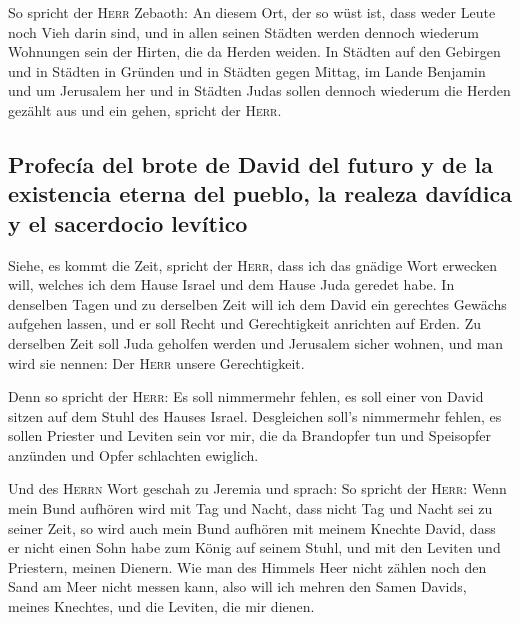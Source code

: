  So spricht der \textsc{Herr} Zebaoth: An diesem Ort, der
so wüst ist, dass weder Leute noch Vieh darin sind, und in allen seinen
Städten werden dennoch wiederum Wohnungen sein der Hirten, die da Herden
weiden.  In Städten auf den Gebirgen und in Städten in
Gründen und in Städten gegen Mittag, im Lande Benjamin und um Jerusalem
her und in Städten Judas sollen dennoch wiederum die Herden gezählt aus
und ein gehen, spricht der \textsc{Herr}.

\hypertarget{profecuxeda-del-brote-de-david-del-futuro-y-de-la-existencia-eterna-del-pueblo-la-realeza-davuxeddica-y-el-sacerdocio-levuxedtico}{%
\subsection{Profecía del brote de David del futuro y de la existencia
eterna del pueblo, la realeza davídica y el sacerdocio
levítico}\label{profecuxeda-del-brote-de-david-del-futuro-y-de-la-existencia-eterna-del-pueblo-la-realeza-davuxeddica-y-el-sacerdocio-levuxedtico}}

 Siehe, es kommt die Zeit, spricht der \textsc{Herr},
dass ich das gnädige Wort erwecken will, welches ich dem Hause Israel
und dem Hause Juda geredet habe.  In denselben Tagen und
zu derselben Zeit will ich dem David ein gerechtes Gewächs aufgehen
lassen, und er soll Recht und Gerechtigkeit anrichten auf Erden.
 Zu derselben Zeit soll Juda geholfen werden und
Jerusalem sicher wohnen, und man wird sie nennen: Der \textsc{Herr}
unsere Gerechtigkeit.

 Denn so spricht der \textsc{Herr}: Es soll nimmermehr
fehlen, es soll einer von David sitzen auf dem Stuhl des Hauses Israel.
 Desgleichen soll's nimmermehr fehlen, es sollen Priester
und Leviten sein vor mir, die da Brandopfer tun und Speisopfer anzünden
und Opfer schlachten ewiglich.

 Und des \textsc{Herrn} Wort geschah zu Jeremia und
sprach:  So spricht der \textsc{Herr}: Wenn mein Bund
aufhören wird mit Tag und Nacht, dass nicht Tag und Nacht sei zu seiner
Zeit,  so wird auch mein Bund aufhören mit meinem Knechte
David, dass er nicht einen Sohn habe zum König auf seinem Stuhl, und mit
den Leviten und Priestern, meinen Dienern.  Wie man des
Himmels Heer nicht zählen noch den Sand am Meer nicht messen kann, also
will ich mehren den Samen Davids, meines Knechtes, und die Leviten, die
mir dienen.


